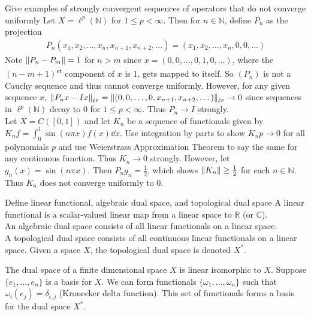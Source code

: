 \documentclass[avery5388,grid,frame]{flashcards}
\def\Rl{\mathbb{R}}
\def\Cx{\mathbb{C}}
\begin{document}
\begin{flashcard}
    {Give examples of strongly convergent sequences of operators that do not converge uniformly}
    Let $X = \ell^p(\mathbb{N})$ for $1 \leq p < \infty$.  Then for $n \in \mathbb{N}$, define $P_n$ as the projection
    \begin{align*}
        P_n(x_1, x_2, \dots, x_n, x_{n+1}, x_{n+2}, \dots) = (x_1, x_2, \dots, x_n, 0, 0, \dots)
    \end{align*}
    Note $\norm{P_n - P_m} = 1$ for $n > m$ since $x = (0, 0, \dots, 0, 1, 0, \dots)$, where the $(n - m + 1)$\textsuperscript{st} component of $x$ is $1$, gets mapped to itself.  So $(P_n)$ is not a Cauchy sequence and thus cannot converge uniformly.  However, for any given sequence $x$, $\norm{P_nx - Ix}_{\ell^p} = \norm{(0, 0, \dots, 0, x_{n+1}, x_{n+2}, \dots)}_{\ell^p} \rightarrow 0$ since sequences in $\ell^p(\mathbb{N})$ decay to $0$ for $1 \leq p < \infty$.  Thus $P_n \rightarrow I$ strongly. \\

    Let $X = C([0,1])$ and let $K_n$ be a sequence of functionals given by $K_nf = \int_0^1 \sin(n \pi x)f(x) \dd x.$  Use integration by parts to show $K_np \rightarrow 0$ for all polynomials $p$ and use Weierstrass Approximation Theorem to say the same for any continuous function.  Thus $K_n \rightarrow 0$ strongly.  However, let $g_n(x) = \sin(n \pi x)$.  Then $P_n g_n = \frac{1}{2}$, which shows $\norm{K_n} \geq \frac{1}{2}$ for each $n \in \mathbb{N}$.  Thus $K_n$ does not converge uniformly to $0$.
\end{flashcard}

\begin{flashcard}
    {Define linear functional, algebraic dual space, and topological dual space}
    A linear functional is a scalar-valued linear map from a linear space to $\Rl$ (or $\Cx$). \\

    An algebraic dual space consists of all linear functionals on a linear space. \\

    A topological dual space consists of all continuous linear functionals on a linear space.  Given a space $X$, the topological dual space is denoted $X^*$.
\end{flashcard}

\begin{flashcard}
    {The dual space of a finite dimensional space $X$ is linear isomorphic to $X$.}
    Suppose $\{e_1, \dots, e_n\}$ is a basis for $X$.  We can form functionals $\{\omega_1, \dots, \omega_n\}$ such that $\omega_i(e_j) = \delta_{i,j}$ (Kronecker delta function).  This set of functionals forms a basis for the dual space $X^*$.
\end{flashcard}
\end{document}
